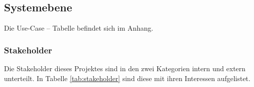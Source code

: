 \documentclass[
   draft=false
  ,paper=a4
  ,twoside=true
  ,fontsize=11pt
  ,headsepline
  ,DIV11
  ,parskip=full+
]{scrartcl} %
\begin{document}
\subsection{Systemebene}
Die Use-Case -- Tabelle befindet sich im Anhang.
\subsubsection{Stakeholder}

Die Stakeholder dieses Projektes sind in den zwei Kategorien intern und extern unterteilt. In Tabelle \ref{tab:stakeholder} sind diese mit ihren Interessen aufgelistet.
\end{document}
